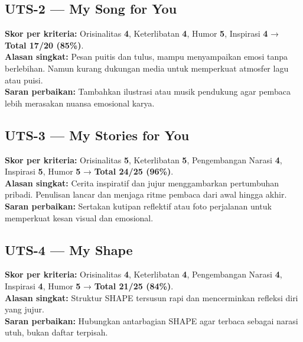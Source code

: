 \documentclass[
  letterpaper,
  DIV=11,
  numbers=noendperiod]{scrreprt}
\begin{document}
\subsection{\texorpdfstring{\textbf{UTS-2 --- My Song for
You}}{UTS-2 --- My Song for You}}\label{uts-2-my-song-for-you}

\textbf{Skor per kriteria:} Orisinalitas \textbf{4}, Keterlibatan
\textbf{4}, Humor \textbf{5}, Inspirasi \textbf{4} → \textbf{Total 17/20
(85\%)}.\\
\textbf{Alasan singkat:} Pesan puitis dan tulus, mampu menyampaikan
emosi tanpa berlebihan. Namun kurang dukungan media untuk memperkuat
atmosfer lagu atau puisi.\\
\textbf{Saran perbaikan:} Tambahkan ilustrasi atau musik pendukung agar
pembaca lebih merasakan nuansa emosional karya.

\subsection{\texorpdfstring{\textbf{UTS-3 --- My Stories for
You}}{UTS-3 --- My Stories for You}}\label{uts-3-my-stories-for-you-1}

\textbf{Skor per kriteria:} Orisinalitas \textbf{5}, Keterlibatan
\textbf{5}, Pengembangan Narasi \textbf{4}, Inspirasi \textbf{5}, Humor
\textbf{5} → \textbf{Total 24/25 (96\%)}.\\
\textbf{Alasan singkat:} Cerita inspiratif dan jujur menggambarkan
pertumbuhan pribadi. Penulisan lancar dan menjaga ritme pembaca dari
awal hingga akhir.\\
\textbf{Saran perbaikan:} Sertakan kutipan reflektif atau foto
perjalanan untuk memperkuat kesan visual dan emosional.

\subsection{\texorpdfstring{\textbf{UTS-4 --- My
Shape}}{UTS-4 --- My Shape}}\label{uts-4-my-shape}

\textbf{Skor per kriteria:} Orisinalitas \textbf{4}, Keterlibatan
\textbf{4}, Pengembangan Narasi \textbf{4}, Inspirasi \textbf{4}, Humor
\textbf{5} → \textbf{Total 21/25 (84\%)}.\\
\textbf{Alasan singkat:} Struktur SHAPE tersusun rapi dan mencerminkan
refleksi diri yang jujur.\\
\textbf{Saran perbaikan:} Hubungkan antarbagian SHAPE agar terbaca
sebagai narasi utuh, bukan daftar terpisah.
\end{document}
